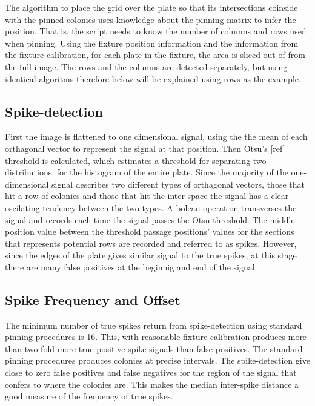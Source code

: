 \documentclass{article}
\begin{document}
The algorithm to place the grid over the plate so that its intersections 
coinside with the pinned colonies uses knowledge about the pinning matrix
to infer the position. 
That is, the script needs to know the number of columns and rows used when
pinning.
Using the fixture position information and the information from the fixture
calibration, for each plate in the fixture, the area is sliced out of from the 
full image. 
The rows and the columns are detected separately, but using identical algoritms
therefore below will be explained using rows as the example.

\subsection{Spike-detection}

First the image is flattened to one dimensional signal, using the the mean of
each orthagonal vector to represent the signal at that position.
Then Otsu's [ref] threshold is calculated, which estimates a threshold for
separating two distributions, for the histogram of the entire plate. 
Since the majority of the one-dimensional signal describes two different types
of orthagonal vectors, those that hit a row of colonies and those that hit the
inter-space the signal has a clear oscilating tendency between the two types.
A bolean operation transverses the signal and records each time the signal
passes the Otsu threshold.
The middle position value between the threshold passage positions' values for
the sections that represents potential rows are recorded and referred to as 
spikes. However, since the edges of the plate gives similar signal to the 
true spikes, at this stage there are many false positives at the beginnig and
end of the signal.

\subsection{Spike Frequency and Offset}

The minimum number of true spikes return from spike-detection using standard
pinning procedures is 16.
This, with reasonable fixture calibration produces more than two-fold more 
true positive spike signals than false positives. 
The standard pinning procedures produces colonies at precise intervals.
The spike-detection give close to zero false positives and false negatives 
for the region of the signal that confers to where the colonies are.
This makes the median inter-spike distance a good measure of the frequency
of true spikes.
\end{document}
